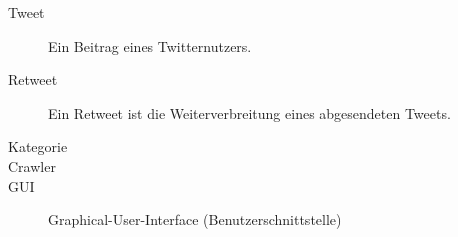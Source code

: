 
\begin{description}
	\item[Tweet] Ein Beitrag eines Twitternutzers.
	\item[Retweet] Ein Retweet ist die Weiterverbreitung eines abgesendeten Tweets.
	\item[Kategorie]
	\item[Crawler]
	\item[GUI] Graphical-User-Interface (Benutzerschnittstelle)
\end{description}
